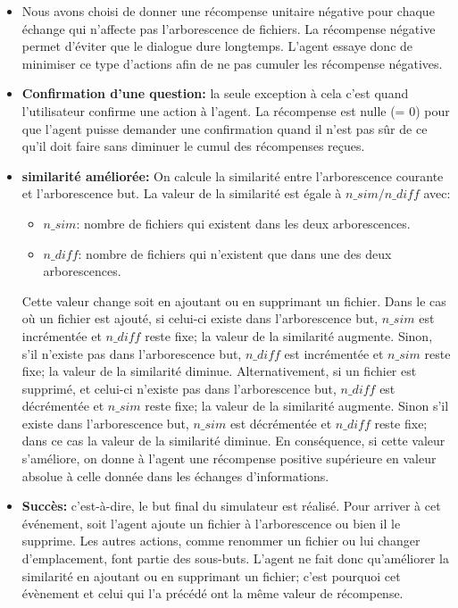 \begin{itemize}
	\item Nous avons choisi de donner une récompense unitaire négative pour chaque échange qui n'affecte pas l'arborescence de fichiers. La récompense négative permet d'éviter que le dialogue dure longtemps. L'agent essaye donc de minimiser ce type d'actions afin de ne pas cumuler les récompense négatives.
	\item \textbf{Confirmation d'une question:} la seule exception à cela c'est quand l'utilisateur confirme une action à l'agent. La récompense est nulle (= 0) pour que l'agent puisse demander une confirmation quand il n'est pas sûr de ce qu'il doit faire sans diminuer le cumul des récompenses reçues.
	\item \textbf{similarité améliorée:} On calcule la similarité entre l'arborescence courante et l'arborescence but. La valeur de la similarité est égale à $n\_sim/n\_diff$ avec: 
	\begin{itemize}
		\item $n\_sim$: nombre de fichiers qui existent dans les deux arborescences.
		\item $n\_diff$: nombre de fichiers qui n'existent que dans une des deux arborescences.  
	\end{itemize}
	Cette valeur change soit en ajoutant ou en supprimant un fichier. Dans le cas où un fichier est ajouté, si celui-ci existe dans l'arborescence but, $n\_sim$ est incrémentée et $n\_diff$ reste fixe; la valeur de la similarité augmente. Sinon, s'il n'existe pas dans l'arborescence but, $n\_diff$ est incrémentée et $n\_sim$ reste fixe; la valeur de la similarité diminue. Alternativement, si un fichier est supprimé, et celui-ci n'existe pas dans l'arborescence but, $n\_diff$ est décrémentée et $n\_sim$ reste fixe; la valeur de la similarité augmente. Sinon s'il existe dans l'arborescence but, $n\_sim$ est décrémentée et $n\_diff$ reste fixe; dans ce cas la valeur de la similarité diminue.
	En conséquence, si cette valeur s'améliore, on donne à l'agent une récompense positive supérieure en valeur absolue à celle donnée dans les échanges d'informations.
	\item \textbf{Succès:} c'est-à-dire, le but final du simulateur est réalisé. Pour arriver à cet événement, soit l'agent ajoute un fichier à l'arborescence ou bien il le supprime. Les autres actions, comme renommer un fichier ou lui changer d'emplacement, font partie des sous-buts. L'agent ne fait donc qu'améliorer la similarité en ajoutant ou en supprimant un fichier; c'est pourquoi cet évènement et celui qui l'a précédé ont la même valeur de récompense.

\end{itemize}
